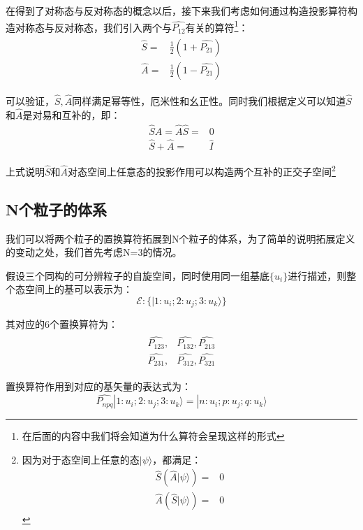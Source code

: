     在得到了对称态与反对称态的概念以后，接下来我们考虑如何通过构造投影算符构造对称态与反对称态，我们引入两个与$\hat{P_{12}}$有关的算符\footnote{在后面的内容中我们将会知道为什么算符会呈现这样的形式}：
    \begin{align}
        \begin{split}
            \hat{S}=&\frac{1}{2}(1+\hat{P_{21}})\\
            \hat{A}=&\frac{1}{2}(1-\hat{P_{21}})
        \end{split}
    \end{align}
    
    可以验证，$\hat{S},\hat{A}$同样满足幂等性，厄米性和幺正性。同时我们根据定义可以知道$\hat{S}$和$\hat{A}$是对易和互补的，即：
    \begin{align}
        \hat{S}\hat{A}=\hat{A}\hat{S}=&0\\
        \hat{S}+\hat{A}=&\hat{I}
    \end{align}
        
    上式说明$\hat{S}$和$\hat{A}$对态空间上任意态的投影作用可以构造两个互补的正交子空间\footnote{因为对于态空间上任意的态$|\psi\rangle$，都满足：
    \begin{align*}
        \hat{S}(\hat{A}|\psi\rangle)=&0\\
        \hat{A}(\hat{S}|\psi\rangle)=&0
    \end{align*}
    }
    \subsection{N个粒子的体系}
    我们可以将两个粒子的置换算符拓展到N个粒子的体系，为了简单的说明拓展定义的变动之处，我们首先考虑N=3的情况。
    
    假设三个同构的可分辨粒子的自旋空间，同时使用同一组基底$\{u_i\}$进行描述，则整个态空间上的基可以表示为：
    \begin{equation}
        \mathscr{E}:\{|1:u_i;2:u_j;3:u_k\rangle\}
    \end{equation}
    
    其对应的6个置换算符为：
    \begin{align}
        \begin{split}
            \hat{P_{123}},& \hat{P_{132}}, \hat{P_{213}}\\
             \hat{P_{231}},& \hat{P_{312}}, \hat{P_{321}}
        \end{split}
    \end{align}
    
    置换算符作用到对应的基矢量的表达式为：
    \begin{equation}
        \hat{P_{npq}}|1:u_i;2:u_j;3:u_k\rangle=|n:u_i;p:u_j;q:u_k\rangle
    \end{equation}
    
